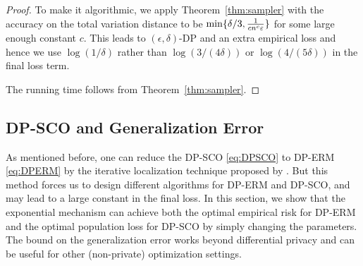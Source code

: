\begin{proof}
To make it algorithmic, we apply Theorem~\ref{thm:sampler} with the accuracy on the total variation distance to be $\min\{\delta/3,\frac{1}{cn^c\varepsilon}\}$ for some large enough constant $c$. This leads to $(\epsilon,\delta)$-DP and an extra empirical loss and hence we use $\log(1/\delta)$ rather than $\log(3/(4\delta))$ or $\log(4/(5\delta))$ in the final loss term. 

The running time follows from Theorem~\ref{thm:sampler}.
\end{proof}


\subsection{DP-SCO and Generalization Error}
As mentioned before, one can reduce the DP-SCO \eqref{eq:DPSCO} to DP-ERM \eqref{eq:DPERM} by the iterative localization technique proposed by \cite{FKT20}.
But this method forces us to design different algorithms for DP-ERM and DP-SCO, and may lead to a large constant in the final loss.
In this section, we show that the exponential mechanism can achieve both the optimal empirical risk for DP-ERM and the optimal population loss for DP-SCO by simply changing the parameters.
The bound on the generalization error works beyond differential privacy and can be useful for other (non-private) optimization settings.




